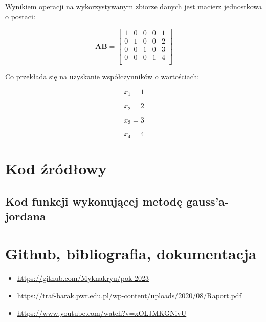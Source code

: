 \documentclass{article}
\begin{document}
Wynikiem operacji na wykorzystywanym zbiorze danych jest macierz jednostkowa o postaci:
\begin{center}
    \begin{equation*}
        \mathbf{AB}=\begin{bmatrix}1 & 0 & 0 & 0 & 1\\0 & 1 & 0 & 0 & 2\\ 0 & 0 & 1 & 0 & 3\\ 0 & 0 & 0 & 1 & 4\\\end{bmatrix}
    \end{equation*}
\end{center}
Co przekłada się na uzyskanie współczynników o wartościach:
\begin{figure}[H]
    \begin{multicols}{4}
        \begin{equation*}
            x_1 = 1
        \end{equation*}
        \par
        \begin{equation*}
            x_2 = 2
        \end{equation*}
        \par
        \begin{equation*}
            x_3 = 3
        \end{equation*}
        \par
        \begin{equation*}
            x_4 = 4
        \end{equation*}
    \end{multicols}
\end{figure}

\section{Kod źródłowy}
\subsection{Kod funkcji wykonującej metodę gauss'a-jordana}


\section{Github, bibliografia, dokumentacja}
\begin{itemize}
    \item \url{https://github.com/Myknakryu/pok-2023}
    \item \url{https://traf-barak.pwr.edu.pl/wp-content/uploads/2020/08/Raport.pdf}
    \item \url{https://www.youtube.com/watch?v=xOLJMKGNivU}
\end{itemize}
\end{document}
